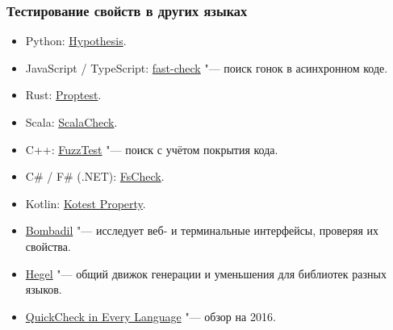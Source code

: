 \documentclass[11pt]{beamer}
\begin{document}
\begin{frame}[fragile]
  \frametitle{Тестирование свойств в других языках}
  \begin{itemize}
    \item Python: \href{https://hypothesis.readthedocs.io/}{Hypothesis}.
    \item JavaScript / TypeScript: \href{https://fast-check.dev/}{fast-check} "--- поиск гонок в асинхронном коде.
    \item Rust: \href{https://proptest-rs.github.io/proptest/intro.html}{Proptest}.
    \item Scala: \href{https://scalacheck.org/}{ScalaCheck}.
    \item C++: \href{https://github.com/google/fuzztest}{FuzzTest} "--- поиск с учётом покрытия кода.
    \item C\# / F\# (.NET): \href{https://fscheck.github.io/FsCheck/}{FsCheck}.
    \item Kotlin: \href{https://kotest.io/docs/proptest/property-based-testing.html}{Kotest Property}.
    \item \href{https://github.com/antithesishq/bombadil}{Bombadil} "--- исследует веб- и терминальные интерфейсы, проверяя их свойства.
    \item \href{https://hegel.dev/}{Hegel} "--- общий движок генерации и уменьшения для библиотек разных языков.
    \item \href{https://hypothesis.works/articles/quickcheck-in-every-language/}{QuickCheck in Every Language} "--- обзор на 2016.
  \end{itemize}
\end{frame}
\end{document}
